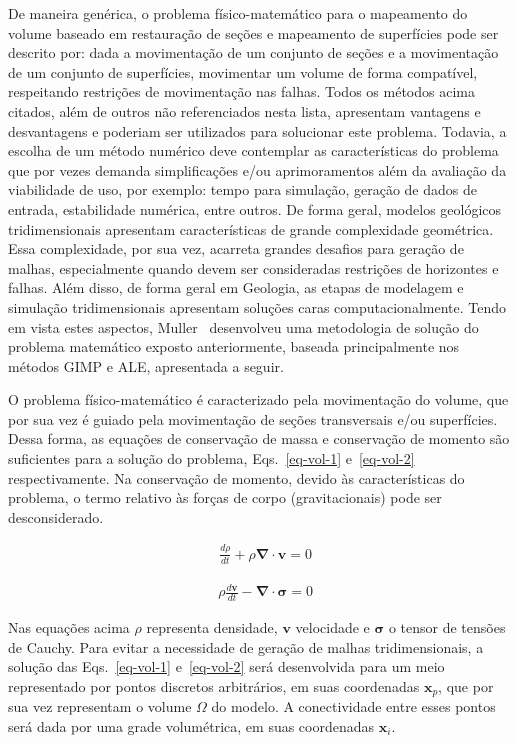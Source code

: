De maneira genérica, o problema físico-matemático para o mapeamento do volume baseado em restauração de seções e mapeamento de superfícies pode ser descrito por: dada a movimentação de um conjunto de seções e a movimentação de um conjunto de superfícies, movimentar um volume de forma compatível, respeitando restrições de movimentação nas falhas. Todos os métodos acima citados, além de outros não referenciados nesta lista, apresentam vantagens e desvantagens e poderiam ser utilizados para solucionar este problema. Todavia, a escolha de um método numérico deve contemplar as características do problema que por vezes demanda simplificações e/ou aprimoramentos além da avaliação da viabilidade de uso, por exemplo: tempo para simulação, geração de dados de entrada, estabilidade numérica, entre outros. De forma geral, modelos geológicos tridimensionais apresentam características de grande complexidade geométrica. Essa complexidade, por sua vez, acarreta grandes desafios para geração de malhas, especialmente quando devem ser consideradas restrições de horizontes e falhas. Além disso, de forma geral em Geologia, as etapas de modelagem e simulação tridimensionais apresentam soluções caras computacionalmente. Tendo em vista estes aspectos, Muller~\cite{Muller} desenvolveu uma metodologia de solução do problema matemático exposto anteriormente, baseada principalmente nos métodos GIMP e ALE, apresentada a seguir.

O problema físico-matemático é caracterizado pela movimentação do volume, que por sua vez é guiado pela movimentação de seções transversais e/ou superfícies. Dessa forma, as equações de conservação de massa e conservação de momento são suficientes para a solução do problema, Eqs.~\ref{eq-vol-1} e~\ref{eq-vol-2} respectivamente. Na conservação de momento, devido às características do problema, o termo relativo às forças de corpo (gravitacionais) pode ser desconsiderado.

\begin{align}
  &\frac{d\rho}{dt} + \rho \mathbf{\nabla}\cdot\boldsymbol{v} = 0\label{eq-vol-1}
\end{align}

\begin{align}
  &\rho\frac{d\boldsymbol{v}}{dt} - \mathbf{\nabla} \cdot \boldsymbol{\sigma} = 0\label{eq-vol-2}
\end{align}

Nas equações acima $\rho$ representa densidade, $\boldsymbol{v}$ velocidade e $\boldsymbol{\sigma}$ o tensor de tensões de Cauchy. Para evitar a necessidade de geração de malhas tridimensionais, a solução das Eqs.~\ref{eq-vol-1} e~\ref{eq-vol-2} será desenvolvida para um meio representado por pontos discretos arbitrários, em suas coordenadas $\boldsymbol{x}_p$, que por sua vez representam o volume $\Omega$ do modelo. A conectividade entre esses pontos será dada por uma grade volumétrica, em suas coordenadas $\boldsymbol{x}_i$.


